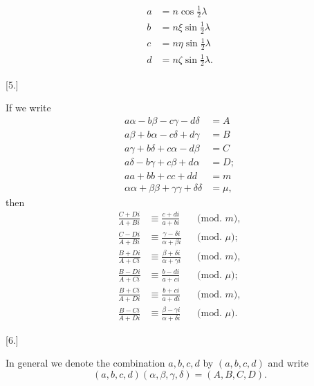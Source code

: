 \[
\begin{aligned}
a&=n\cos\tfrac12\lambda\\
b&=n\xi\sin\tfrac12\lambda\\
c&=n\eta\sin\tfrac12\lambda\\
d&=n\zeta\sin\tfrac12\lambda.
\end{aligned}
\]

\begin{center}[5.]\end{center}

If we write
\[
\begin{aligned}
a\alpha-b\beta-c\gamma-d\delta&=A\\
a\beta+b\alpha-c\delta+d\gamma&=B\\
a\gamma+b\delta+c\alpha-d\beta&=C\\
a\delta-b\gamma+c\beta+d\alpha&=D;\\
aa+bb+cc+dd&=m\\
\alpha\alpha+\beta\beta+\gamma\gamma+\delta\delta&=\mu,
\end{aligned}
\]
then
\[
\begin{aligned}
\frac{C+Di}{A+Bi}&\equiv\frac{c+di}{a+bi}&&\text{(mod. }m\text{)},\\[3pt]
\frac{C-Di}{A+Bi}&\equiv\frac{\gamma-\delta i}{\alpha+\beta i}&&\text{(mod. }\mu\text{)};\\[12pt]
\frac{B+Di}{A+Ci}&\equiv\frac{\beta+\delta i}{\alpha+\gamma i}&&\text{(mod. }m\text{)},\\[3pt]
\frac{B-Di}{A+Ci}&\equiv\frac{b-di}{a+ci}&&\text{(mod. }\mu\text{)};\\[12pt]
\frac{B+Ci}{A+Di}&\equiv\frac{b+ci}{a+di}&&\text{(mod. }m\text{)},\\[3pt]
\frac{B-Ci}{A+Di}&\equiv\frac{\beta-\gamma i}{\alpha+\delta i}&&\text{(mod. }\mu\text{)}.
\end{aligned}
\]

\begin{center}[6.]\end{center}

In general we denote the combination $a,b,c,d$ by $(a,b,c,d)$ and write
\[
(a,b,c,d)(\alpha,\beta,\gamma,\delta)=(A,B,C,D).
\]
